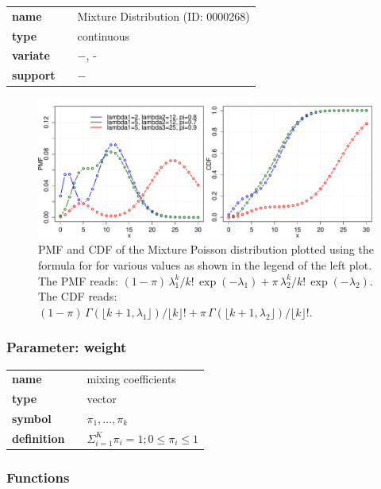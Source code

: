   \bigskip 

\begin{tabular}{p{2cm}cl}
\textbf{name} & & Mixture Distribution (ID: 0000268)\\ 
 
\textbf{type} & & continuous \\ 

\textbf{variate} & & $-$, - \\ 

\textbf{support} & & $-$
\end{tabular}
\begin{figure}[htb!]
\centering
  \includegraphics[width=140mm]{pics/MixturePoisson_pmf_cdf}
 \caption{PMF and CDF of the Mixture Poisson distribution plotted using the formula for 
 for various values as shown in the legend of the left plot. The PMF reads: $(1\!-\!\pi) \,\lambda_1^k/k! \,\exp(-\lambda_1) + \pi\,\lambda_2^k / k! \, \exp(-\lambda_2)$. The CDF reads: $(1-\pi)\,\Gamma(\lfloor k+1 , \lambda_1 \rfloor) / \lfloor k \rfloor!+\pi \,\Gamma(\lfloor k+1 , \lambda_2 \rfloor) / \lfloor k \rfloor!$.}
 \label{fig:MixturePoisson_pmf_cdf}
\end{figure}
\subsubsection*{Parameter: weight}

\noindent\begin{tabular}{p{2cm}cl}
\textbf{name} & & mixing coefficients \\
\textbf{type} & & vector \\
\textbf{symbol} & & $\pi_1, \ldots, \pi_k$  \\
\textbf{definition} & & $\Sigma_{i=1}^K \pi_i=1; 0\le \pi_i \le 1$
\end{tabular}
\subsubsection*{Functions}


